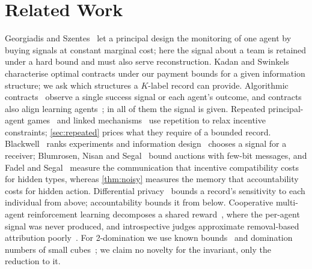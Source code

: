 \documentclass[sigconf,anonymous,acmthm=false]{acmart}
\theoremstyle{acmplain}
\theoremstyle{acmdefinition}
\begin{document}
\section{Related Work}\label{sec:related}

Georgiadis and Szentes~\cite{georgiadisszentes2020} let a principal design the monitoring of
one agent by buying signals at constant marginal cost; here the signal about a team is
retained under a hard bound and must also serve reconstruction. Kadan and
Swinkels~\cite{kadanswinkels2008} characterise optimal contracts under our payment bounds for
a given information structure; we ask which structures a $K$-label record can provide.
Algorithmic contracts~\cite{dutting2024survey,babaioff2006combinatorial,dutting2025multiagent,dutting2025combinatorial,castiglioni2023multiagent,goel2024weighted}
observe a single success signal or each agent's outcome, and contracts also align learning
agents~\cite{haupt2023contracts,ivanov2024principal,shao2025truth}; in all of them the signal
is given. Repeated principal-agent games~\cite{radner1985repeated} and linked
mechanisms~\cite{jacksonsonnenschein2007} use repetition to relax incentive constraints;
\cref{sec:repeated} prices what they require of a bounded record. Blackwell~\cite{blackwell1953comparisons} ranks experiments and
information design~\cite{kamenica2011persuasion} chooses a signal for a receiver; Blumrosen,
Nisan and Segal~\cite{blumrosen2007auctions} bound auctions with few-bit messages, and Fadel
and Segal~\cite{fadelsegal2009} measure the communication that incentive compatibility costs
for hidden types, whereas \cref{thm:noisy} measures the memory that accountability costs for
hidden action. Differential privacy~\cite{dwork2006calibrating} bounds a record's sensitivity
to each individual from above; accountability bounds it from below. Cooperative multi-agent
reinforcement learning decomposes a shared
reward~\cite{foerster2018coma,sunehag2018vdn,rashid2018qmix,li2025nucleolus}, where the
per-agent signal was never produced, and introspective judges approximate removal-based
attribution poorly~\cite{lu2026agents}. For 2-domination we use known
bounds~\cite{fink1985ndomination,chellali2012survey,bujtas2016bounds} and domination numbers
of small cubes~\cite{ostergard2001length9}; we claim no novelty for the invariant, only the
reduction to it.

\end{document}
